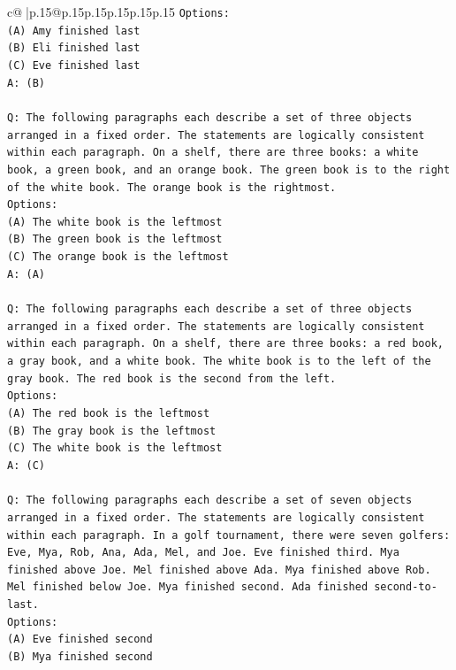 \documentclass{article}
\begin{document}
{\begin{supertabular}{c@{$\;$}|p{.15\linewidth}@{}p{.15\linewidth}p{.15\linewidth}p{.15\linewidth}p{.15\linewidth}p{.15\linewidth}}
{{{\texttt{Options:} \\
\texttt{(A) Amy finished last} \\
\texttt{(B) Eli finished last} \\
\texttt{(C) Eve finished last} \\
\texttt{A: (B)} \\
\\ 
\texttt{Q: The following paragraphs each describe a set of three objects arranged in a fixed order. The statements are logically consistent within each paragraph. On a shelf, there are three books: a white book, a green book, and an orange book. The green book is to the right of the white book. The orange book is the rightmost.} \\
\texttt{Options:} \\
\texttt{(A) The white book is the leftmost} \\
\texttt{(B) The green book is the leftmost} \\
\texttt{(C) The orange book is the leftmost} \\
\texttt{A: (A)} \\
\\ 
\texttt{Q: The following paragraphs each describe a set of three objects arranged in a fixed order. The statements are logically consistent within each paragraph. On a shelf, there are three books: a red book, a gray book, and a white book. The white book is to the left of the gray book. The red book is the second from the left.} \\
\texttt{Options:} \\
\texttt{(A) The red book is the leftmost} \\
\texttt{(B) The gray book is the leftmost} \\
\texttt{(C) The white book is the leftmost} \\
\texttt{A: (C)} \\
\\ 
\texttt{Q: The following paragraphs each describe a set of seven objects arranged in a fixed order. The statements are logically consistent within each paragraph. In a golf tournament, there were seven golfers: Eve, Mya, Rob, Ana, Ada, Mel, and Joe. Eve finished third. Mya finished above Joe. Mel finished above Ada. Mya finished above Rob. Mel finished below Joe. Mya finished second. Ada finished second{-}to{-}last.} \\
\texttt{Options:} \\
\texttt{(A) Eve finished second} \\
\texttt{(B) Mya finished second} \\
}}}
\end{supertabular}}
\end{document}
